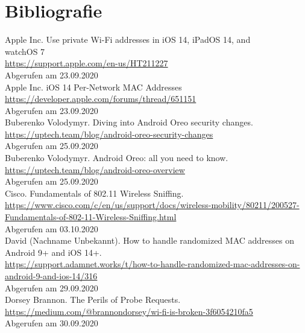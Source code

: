 \clearpage

\section*{Bibliografie}
 
Apple Inc. Use private Wi-Fi addresses in iOS 14, iPadOS 14, and \\ watchOS 7 \\
\url{https://support.apple.com/en-us/HT211227} \\
Abgerufen am 23.09.2020 \\
\newline
Apple Inc. iOS 14 Per-Network MAC Addresses \\
\url{https://developer.apple.com/forums/thread/651151} \\
Abgerufen am 23.09.2020 \\
\newline
Buberenko Volodymyr. Diving into Android Oreo security changes. \\
\url{https://uptech.team/blog/android-oreo-security-changes} \\
Abgerufen am 25.09.2020 \\
\newline
Buberenko Volodymyr. Android Oreo: all you need to know. \\
\url{https://uptech.team/blog/android-oreo-overview} \\
Abgerufen am 25.09.2020 \\
\newline
Cisco. Fundamentals of 802.11 Wireless Sniffing. \\
\url{https://www.cisco.com/c/en/us/support/docs/wireless-mobility/80211/200527-Fundamentals-of-802-11-Wireless-Sniffing.html} \\
Abgerufen am 03.10.2020 \\
\newline
David (Nachname Unbekannt). How to handle randomized MAC addresses on Android 9+ and iOS 14+. \\
\url{https://support.adamnet.works/t/how-to-handle-randomized-mac-addresses-on-android-9-and-ios-14/316} \\
Abgerufen am 29.09.2020 \\
\newline
Dorsey Brannon. The Perils of Probe Requests. \\
\url{https://medium.com/@brannondorsey/wi-fi-is-broken-3f6054210fa5} \\
Abgerufen am 30.09.2020 \\
